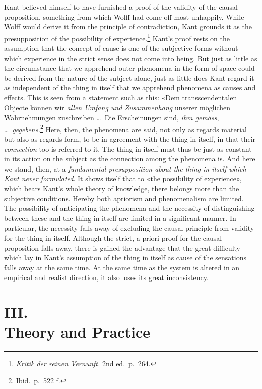 \documentclass[12pt,a4paper]{article}
\newcommand{\opage}[1]{\marginnote{\footnotesize\textit{[#1]}}}
\begin{document}
Kant believed himself to have furnished a proof of the validity of the
causal proposition, something from which Wolff had come off most
unhappily. While Wolff would derive it from the principle of contradiction,
Kant grounds it as the presupposition of the possibility of
experience.\footnote{\textit{Kritik der reinen Vernunft.} 2nd ed.\ p.\
264.} Kant's proof rests on the assumption that the concept of cause is one
of the subjective forms without which experience in the strict sense does
not come into being. But just as little as the circumstance that we
apprehend outer phenomena in the form of space could be derived from the
nature of the subject alone, just as little does Kant regard it as
independent of the thing in itself that we apprehend phenomena as causes
and effects. This is seen from a statement such as this: «Dem
transscendentalen Objecte können wir \emph{allen Umfang und Zusammenhang} unserer
möglichen Wahrnehmungen zuschreiben \ldots\ Die Erscheinungen sind, \emph{ihm
gemäss}, \ldots\ \emph{gegeben}».\footnote{Ibid.\ p.\ 522 f.} Here, then, the
phenomena are said, not only as regards material but also as regards form,
to be in agreement with the thing in itself, in that their \emph{connection} too
is referred to it. The thing in itself must thus be just as constant in its
action on the subject as the connection among the phenomena is. And here we
stand, then, at a \emph{fundamental presupposition about the thing in itself
which Kant never formulated}. It shows itself that to «the possibility of
experience», which bears Kant's whole theory of knowledge, there belongs
\opage{35}more than the subjective conditions. Hereby both apriorism and
phenomenalism are limited. The possibility of anticipating the phenomena
and the necessity of distinguishing between these and the thing in itself
are limited in a significant manner. In particular, the necessity falls
away of excluding the causal principle from validity for the thing in
itself. Although the strict, a priori proof for the causal proposition
falls away, there is gained the advantage that the great difficulty which
lay in Kant's assumption of the thing in itself as cause of the sensations
falls away at the same time. At the same time as the system is altered in an
empirical and realist direction, it also loses its great inconsistency.

\section*{III.\\ Theory and Practice}
\end{document}
